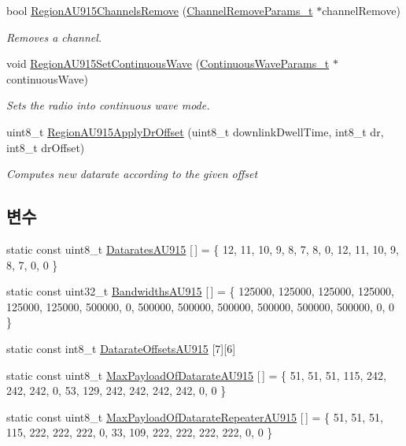 \begin{DoxyCompactItemize}
bool \mbox{\hyperlink{group___r_e_g_i_o_n_a_u915_ga4dfd376f684a40c659c69bf127a71a71}{Region\+A\+U915\+Channels\+Remove}} (\mbox{\hyperlink{group___r_e_g_i_o_n_gaa37468560d2fc81a977b57a48e5d72c0}{Channel\+Remove\+Params\+\_\+t}} $\ast$channel\+Remove)
\begin{DoxyCompactList}\small\item\em Removes a channel. \end{DoxyCompactList}\item 
void \mbox{\hyperlink{group___r_e_g_i_o_n_a_u915_gae8d539bbf21ee45777245dc1467fa07a}{Region\+A\+U915\+Set\+Continuous\+Wave}} (\mbox{\hyperlink{group___r_e_g_i_o_n_gaf39bb5ba06921139c6d17f88a8d518cd}{Continuous\+Wave\+Params\+\_\+t}} $\ast$continuous\+Wave)
\begin{DoxyCompactList}\small\item\em Sets the radio into continuous wave mode. \end{DoxyCompactList}\item 
uint8\+\_\+t \mbox{\hyperlink{group___r_e_g_i_o_n_a_u915_gacdcc572470d582ce82ca60df7ffe37b0}{Region\+A\+U915\+Apply\+Dr\+Offset}} (uint8\+\_\+t downlink\+Dwell\+Time, int8\+\_\+t dr, int8\+\_\+t dr\+Offset)
\begin{DoxyCompactList}\small\item\em Computes new datarate according to the given offset \end{DoxyCompactList}\end{DoxyCompactItemize}
\subsection*{변수}
\begin{DoxyCompactItemize}
\item 
static const uint8\+\_\+t \mbox{\hyperlink{group___r_e_g_i_o_n_a_u915_gaf86f3852261cee915f4132bd35e6c188}{Datarates\+A\+U915}} \mbox{[}$\,$\mbox{]} = \{ 12, 11, 10, 9, 8, 7, 8, 0, 12, 11, 10, 9, 8, 7, 0, 0 \}
\item 
static const uint32\+\_\+t \mbox{\hyperlink{group___r_e_g_i_o_n_a_u915_ga02efc5a531fde19a519564cc39dd9bff}{Bandwidths\+A\+U915}} \mbox{[}$\,$\mbox{]} = \{ 125000, 125000, 125000, 125000, 125000, 125000, 500000, 0, 500000, 500000, 500000, 500000, 500000, 500000, 0, 0 \}
\item 
static const int8\+\_\+t \mbox{\hyperlink{group___r_e_g_i_o_n_a_u915_ga21954b1aad2914192201787f60b2203b}{Datarate\+Offsets\+A\+U915}} \mbox{[}7\mbox{]}\mbox{[}6\mbox{]}
\item 
static const uint8\+\_\+t \mbox{\hyperlink{group___r_e_g_i_o_n_a_u915_gabe0bab50ef304824a4ed2710876e948b}{Max\+Payload\+Of\+Datarate\+A\+U915}} \mbox{[}$\,$\mbox{]} = \{ 51, 51, 51, 115, 242, 242, 242, 0, 53, 129, 242, 242, 242, 242, 0, 0 \}
\item 
static const uint8\+\_\+t \mbox{\hyperlink{group___r_e_g_i_o_n_a_u915_ga4d811d08c5b947fdb028138f034317d0}{Max\+Payload\+Of\+Datarate\+Repeater\+A\+U915}} \mbox{[}$\,$\mbox{]} = \{ 51, 51, 51, 115, 222, 222, 222, 0, 33, 109, 222, 222, 222, 222, 0, 0 \}
\end{DoxyCompactItemize}


